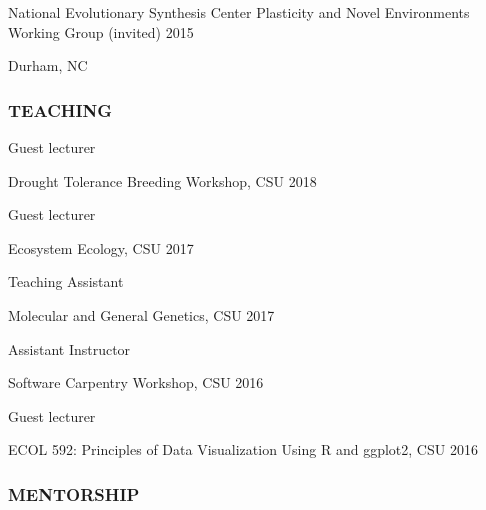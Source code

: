 \documentclass[12pt,english]{article}
\begin{document}
\hspace*{1.0em}National Evolutionary Synthesis Center Plasticity and Novel Environments Working Group (invited) \hfill 2015 \par
\hspace*{2.0em}Durham, NC \par\vspace{0.5ex}


\subsubsection*{TEACHING}
\vspace{-0.5ex}\par
\hspace*{1.0em} Guest lecturer
\par
\hspace*{2.0em} Drought Tolerance Breeding Workshop, CSU
\hfill
2018
\par
\vspace{0.5em}
\hspace*{1.0em} Guest lecturer
\par
\hspace*{2.0em} Ecosystem Ecology, CSU
\hfill
2017
\par
\vspace{0.5em}
\hspace*{1.0em} Teaching Assistant
\par
\hspace*{2.0em} Molecular and General Genetics, CSU
\hfill
2017
\par
\vspace{0.5em}
\hspace*{1.0em} Assistant Instructor
\par
\hspace*{2.0em} Software Carpentry Workshop, CSU
\hfill
2016
\par
\vspace{0.5em}
\hspace*{1.0em} Guest lecturer
\par
\hspace*{2.0em} ECOL 592: Principles of Data Visualization Using R and ggplot2, CSU
\hfill
2016
\vspace{0.5em}
\par

\subsubsection*{MENTORSHIP}
\vspace{-0.5ex}\par
\end{document}
